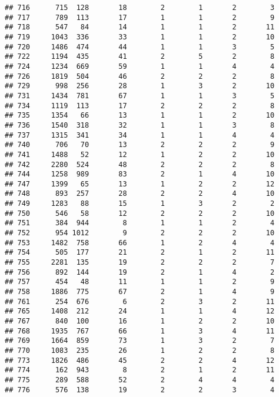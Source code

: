 \documentclass[]{article}
\begin{document}
\begin{verbatim}
## 716      715  128       18        2        1       2        3
## 717      789  113       17        1        1       2        9
## 718      547   84       14        1        1       2       11
## 719     1043  336       33        1        1       2       10
## 720     1486  474       44        1        1       3        5
## 722     1194  435       41        2        5       2        8
## 724     1234  669       59        1        1       4        4
## 726     1819  504       46        2        2       2        8
## 729      998  256       28        1        3       2       10
## 731     1434  781       67        1        1       3        5
## 734     1119  113       17        2        2       2        8
## 735     1354   66       13        1        1       2       10
## 736     1540  318       32        1        1       3        8
## 737     1315  341       34        1        1       4        4
## 740      706   70       13        2        2       2        9
## 741     1488   52       12        1        2       2       10
## 742     2280  524       48        2        2       2        8
## 744     1258  989       83        2        1       4       10
## 747     1399   65       13        1        2       2       12
## 748      893  257       28        2        2       4       10
## 749     1283   88       15        1        3       2        2
## 750      546   58       12        2        2       2       10
## 751      384  944        8        1        1       2        4
## 752      954 1012        9        2        2       2       10
## 753     1482  758       66        1        2       4        4
## 754      505  177       21        2        1       2       11
## 755     2281  135       19        2        2       2        7
## 756      892  144       19        2        1       4        2
## 757      454   48       11        1        1       2        9
## 758     1886  775       67        2        1       4        9
## 761      254  676        6        2        3       2       11
## 765     1408  212       24        1        1       4       12
## 767      840  100       16        1        2       2       10
## 768     1935  767       66        1        3       4       11
## 769     1664  859       73        1        3       2        7
## 770     1083  235       26        1        2       2        8
## 773     1826  486       45        2        2       4       12
## 774      162  943        8        2        1       2       11
## 775      289  588       52        2        4       4        4
## 776      576  138       19        2        2       3        4

\end{verbatim}
\end{document}
